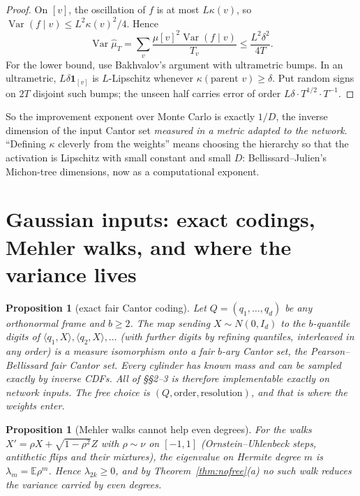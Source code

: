 \documentclass[11pt]{article}
\newtheorem{proposition}[theorem]{Proposition}
\theoremstyle{definition}
\theoremstyle{remark}
\newcommand{\E}{\mathbb E}
\newcommand{\Var}{\operatorname{Var}}
\begin{document}
\begin{proof}
On $[v]$, the oscillation of $f$ is at most $L\kappa(v)$, so $\Var(f\mid v)\le L^2\kappa(v)^2/4$. Hence
\[\Var\hat\mu_T=\sum_v\frac{\mu[v]^2\Var(f\mid v)}{T_v}\le\frac{L^2\delta^2}{4T}.\]
For the lower bound, use Bakhvalov's argument with ultrametric bumps. In an ultrametric, $L\delta\mathbf 1_{[v]}$ is $L$-Lipschitz whenever $\kappa(\text{parent }v)\ge\delta$. Put random signs on $2T$ disjoint such bumps; the unseen half carries error of order $L\delta\cdot T^{1/2}\cdot T^{-1}$.
\end{proof}

So the improvement exponent over Monte Carlo is exactly $1/D$, the inverse dimension of the input Cantor set \emph{measured in a metric adapted to the network}. ``Defining $\kappa$ cleverly from the weights'' means choosing the hierarchy so that the activation is Lipschitz with small constant and small $D$: Bellissard--Julien's Michon-tree dimensions, now as a computational exponent.

\section{Gaussian inputs: exact codings, Mehler walks, and where the variance lives}

\begin{proposition}[exact fair Cantor coding]
Let $Q=(q_1,\dots,q_d)$ be any orthonormal frame and $b\ge2$. The map sending $X\sim N(0,I_d)$ to the $b$-quantile digits of $\langle q_1,X\rangle,\langle q_2,X\rangle,\dots$ (with further digits by refining quantiles, interleaved in any order) is a measure isomorphism onto a fair $b$-ary Cantor set, the Pearson--Bellissard fair Cantor set. Every cylinder has known mass and can be sampled exactly by inverse CDFs. All of \S\S2--3 is therefore implementable exactly on network inputs. The free choice is $(Q,\text{order},\text{resolution})$, and that is where the weights enter.
\end{proposition}

\begin{proposition}[Mehler walks cannot help even degrees]
For the walks $X'=\rho X+\sqrt{1-\rho^2}Z$ with $\rho\sim\nu$ on $[-1,1]$ (Ornstein--Uhlenbeck steps, antithetic flips and their mixtures), the eigenvalue on Hermite degree $m$ is $\lambda_m=\E\rho^m$. Hence $\lambda_{2k}\ge0$, and by Theorem~\ref{thm:nofree}(a) no such walk reduces the variance carried by even degrees.
\end{proposition}
\end{document}
